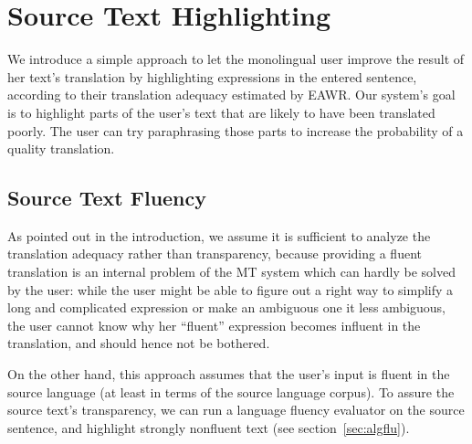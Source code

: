 \documentclass[hidelinks,10pt,letter]{article} %
\begin{document}
    
      
      

    
    
    \section{Source Text Highlighting}\label{sec:sth}
    
    We introduce a simple approach to let the monolingual user improve the result of her text's translation
    by highlighting expressions in the entered sentence, according to their translation adequacy
    estimated by EAWR. Our system's goal is to highlight parts of the user's text that are likely to have
    been translated poorly. The user can try paraphrasing those parts to increase the probability of a quality
    translation.
    
    \subsection{Source Text Fluency}
    
    As pointed out in the introduction, we assume it is sufficient to analyze the translation
    adequacy rather than transparency, because providing a fluent translation is an internal problem of the
    MT system which can hardly be solved by the user: while the user might be able to figure out a
    right way to simplify a long and complicated expression or make an ambiguous one it less ambiguous, the user cannot know
    why her ``fluent'' expression becomes influent in the translation, and should hence not be bothered.
    
    On the other hand, this approach assumes that the user's input is fluent in the source language 
    (at least in terms of the source language corpus). To assure
    the source text's transparency, we can run a language fluency evaluator on the source sentence,
    and highlight strongly nonfluent text (see section~\ref{sec:algflu}).
    
\end{document}
